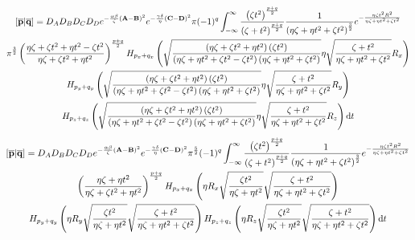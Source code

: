 \begin{multline}
  \left[\overline{\mathbf{p}}\middle|\overline{\mathbf{q}}\right] = D_A D_B D_C D_D e^{-\frac{\alpha\beta}{\zeta}\left(\mathbf{A} - \mathbf{B}\right)^2}e^{-\frac{\gamma\delta}{\eta}\left(\mathbf{C} - \mathbf{D}\right)^2}\pi (-1)^{q} \int_{-\infty}^\infty \frac{\left(\zeta t^2\right)^{\frac{p + q}{2}}}{\left(\zeta + t^2\right)^{\frac{p + q}{2}}}\frac{1}{\left(\eta \zeta + \eta t^2 + \zeta t^2\right)^{\frac{3}{2}}} e^{-\frac{\eta\zeta t^2 R^2}{\eta\zeta + \eta t^2 + \zeta t^2}}\\
  \pi^{\frac{3}{2}} \left(\frac{\eta\zeta + \zeta t^2 + \eta t^2 - \zeta t^2}{\eta\zeta + \zeta t^2 + \eta t^2}\right)^{\frac{p + q}{2}}H_{p_x + q_x}\left(\sqrt{\frac{\left(\eta\zeta + \zeta t^2 + \eta t^2\right)\left(\zeta t^2\right)}{\left(\eta\zeta + \eta t^2 + \zeta t^2 - \zeta t^2\right)\left(\eta\zeta + \eta t^2 + \zeta t^2\right)}}\eta\sqrt{\frac{\zeta + t^2}{\eta\zeta + \eta t^2 + \zeta t^2}}R_x\right)\\
  H_{p_y + q_y}\left(\sqrt{\frac{\left(\eta\zeta + \zeta t^2 + \eta t^2\right)\left(\zeta t^2\right)}{\left(\eta\zeta + \eta t^2 + \zeta t^2 - \zeta t^2\right)\left(\eta\zeta + \eta t^2 + \zeta t^2\right)}}\eta\sqrt{\frac{\zeta + t^2}{\eta\zeta + \eta t^2 + \zeta t^2}}R_y\right)\\
  H_{p_z + q_z}\left(\sqrt{\frac{\left(\eta\zeta + \zeta t^2 + \eta t^2\right)\left(\zeta t^2\right)}{\left(\eta\zeta + \eta t^2 + \zeta t^2 - \zeta t^2\right)\left(\eta\zeta + \eta t^2 + \zeta t^2\right)}}\eta\sqrt{\frac{\zeta + t^2}{\eta\zeta + \eta t^2 + \zeta t^2}}R_z\right) \mathrm{d} t
\end{multline}
\begin{multline}
  \left[\overline{\mathbf{p}}\middle|\overline{\mathbf{q}}\right] = D_A D_B D_C D_D e^{-\frac{\alpha\beta}{\zeta}\left(\mathbf{A} - \mathbf{B}\right)^2}e^{-\frac{\gamma\delta}{\eta}\left(\mathbf{C} - \mathbf{D}\right)^2}\pi^{\frac{5}{2}} (-1)^{q} \int_{-\infty}^\infty \frac{\left(\zeta t^2\right)^{\frac{p + q}{2}}}{\left(\zeta + t^2\right)^{\frac{p + q}{2}}}\frac{1}{\left(\eta \zeta + \eta t^2 + \zeta t^2\right)^{\frac{3}{2}}} e^{-\frac{\eta\zeta t^2 R^2}{\eta\zeta + \eta t^2 + \zeta t^2}}\\
    \left(\frac{\eta\zeta + \eta t^2}{\eta\zeta + \zeta t^2 + \eta t^2}\right)^{\frac{p + q}{2}}H_{p_x + q_x}\left(\eta R_x\sqrt{\frac{\zeta t^2}{\eta\zeta + \eta t^2}}\sqrt{\frac{\zeta + t^2}{\eta\zeta + \eta t^2 + \zeta t^2}}\right)\\
  H_{p_y + q_y}\left(\eta R_y\sqrt{\frac{\zeta t^2}{\eta\zeta + \eta t^2}}\sqrt{\frac{\zeta + t^2}{\eta\zeta + \eta t^2 + \zeta t^2}}\right)H_{p_z + q_z}\left(\eta R_z\sqrt{\frac{\zeta t^2}{\eta\zeta + \eta t^2}}\sqrt{\frac{\zeta + t^2}{\eta\zeta + \eta t^2 + \zeta t^2}}\right) \mathrm{d} t
\end{multline}
